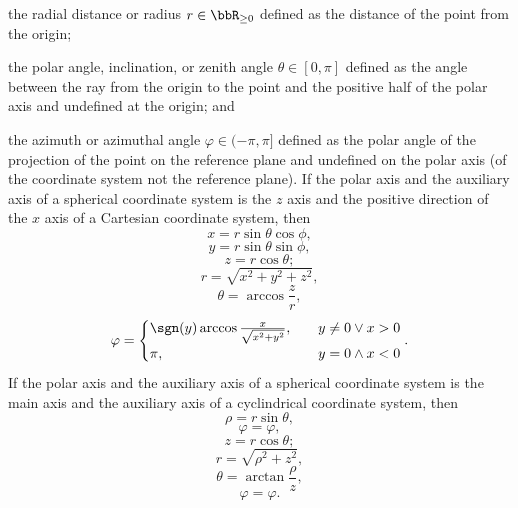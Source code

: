 \item the radial distance or radius $r\in\bbR_{\geq 0}$ defined as the distance of the point from the origin;
\item the polar angle, inclination, or zenith angle $\theta\in[0,\pi]$ defined as the angle between the ray from the origin to the point and the positive half of the polar axis and undefined at the origin; and
\item the azimuth or azimuthal angle $\varphi\in(-\pi,\pi]$ defined as the polar angle of the projection of the point on the reference plane and undefined on the polar axis (of the coordinate system not the reference plane).
\eit
{}
If the polar axis and the auxiliary axis of a spherical coordinate system is the $z$ axis and the positive direction of the $x$ axis of a Cartesian coordinate system, then
\[x=r\sin\theta\cos\phi,\]
\[y=r\sin\theta\sin\phi,\]
\[z=r\cos\theta;\]
\[r=\sqrt{x^2+y^2+z^2},\]
\[\theta=\arccos\frac{z}{r},\]
\[\varphi=\begin{cases}\sgn(y)\arccos\frac{x}{\sqrt{x^2+y^2}},\quad&y\neq 0\lor x>0\\\pi,\quad&y=0\land x<0\end{cases}.\]
If the polar axis and the auxiliary axis of a spherical coordinate system is the main axis and the auxiliary axis of a cyclindrical coordinate system, then
\[\rho=r\sin\theta,\]
\[\varphi=\varphi,\]
\[z=r\cos\theta;\]
\[r=\sqrt{\rho^2+z^2},\]
\[\theta=\arctan\frac{\rho}{z},\]
\[\varphi=\varphi.\]